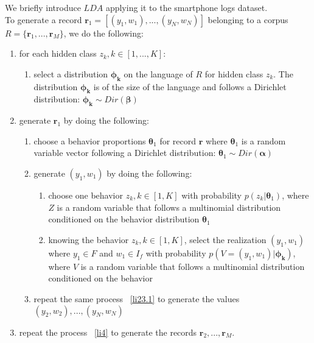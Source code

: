 We briefly introduce $LDA$ applying it to the smartphone logs dataset.
\\To generate a record $\mathbf{r}_{1}=[(y_{1},w_{1}),...,(y_{N},w_{N})]$ belonging to a corpus $R=\{\mathbf{r}_{1},...,\mathbf{r}_{M}\}$, we do the following:
\begin{enumerate} 
	\item for each hidden class $z_{k}, k\in[1,...,K]$:
		\begin{enumerate}
		 	\item select a distribution $\boldsymbol{\phi _{k}}$ on the language of $R$ for hidden class $z_{k}$. The distribution $\boldsymbol{\phi _{k}}$ is of the size of the language and follows a Dirichlet distribution: $					\boldsymbol{\phi _{k}}\sim Dir(\boldsymbol{\beta})$ \label{li22}
		\end{enumerate}
	\item generate $\mathbf{r}_{1}$ by doing the following: \label{li4}
		\begin{enumerate}
			\item choose a behavior proportions $\boldsymbol{\theta }_{1}$ for record $\mathbf{r}$ where $\boldsymbol{\theta }_{1}$ is a random variable vector following a Dirichlet distribution: $\boldsymbol{\theta }_{1}\sim 								Dir(\boldsymbol{\alpha })$ \label{li22} 
			\item generate $(y_{1},w_{1})$ by doing the following: \label{li23.1}
	 			\begin{enumerate}
		 			\item choose one behavior $z_{k},k\in [1,K]$ with probability $p(z_{k}|\boldsymbol{\theta }_{1})$, where $Z$ is a random variable that follows a multinomial distribution conditioned on the behavior distribution $						\boldsymbol{\theta }_{1}$
		 			\item knowing the behavior $z_{k},k\in [1,K]$, select the realization $(y_{1},w_{1})$ where $y_{1}\in F$ and $w_{1}\in I_{f}$ with probability $p(V=(y_{1},w_{1})|\boldsymbol{\phi _{k}})$, where $V$ is a 							random variable that follows a multinomial distribution conditioned on the behavior
				 \end{enumerate}
			\item repeat the same process ~\ref{li23.1} to generate the values $(y_{2},w_{2}),...,(y_{N},w_{N})$ 
		\end{enumerate}
	\item repeat the process ~\ref{li4} to generate the records $\mathbf{r}_{2},...,\mathbf{r}_{M}$.
\end{enumerate} \par

